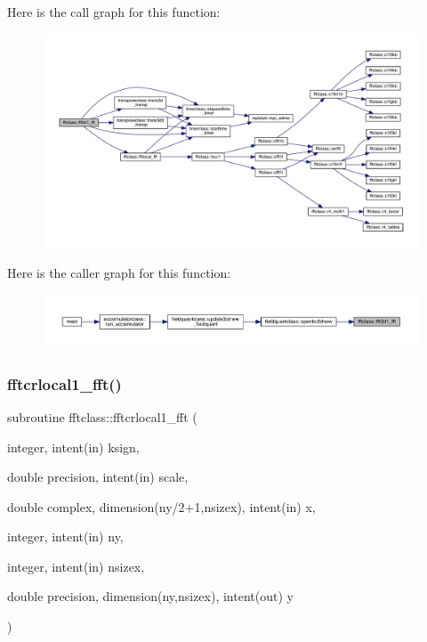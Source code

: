 Here is the call graph for this function\+:
\nopagebreak
\begin{figure}[H]
\begin{center}
\leavevmode
\includegraphics[width=350pt]{namespacefftclass_acef38aed3ece8d2c1120ce0004e6297e_cgraph}
\end{center}
\end{figure}
Here is the caller graph for this function\+:\nopagebreak
\begin{figure}[H]
\begin{center}
\leavevmode
\includegraphics[width=350pt]{namespacefftclass_acef38aed3ece8d2c1120ce0004e6297e_icgraph}
\end{center}
\end{figure}
\mbox{\label{namespacefftclass_a25ecfa928dd28501b9c251c1e887996b}} 
\subsubsection{\texorpdfstring{fftcrlocal1\_fft()}{fftcrlocal1\_fft()}}
{\footnotesize\ttfamily subroutine fftclass\+::fftcrlocal1\+\_\+fft (\begin{DoxyParamCaption}\item[{integer, intent(in)}]{ksign,  }\item[{double precision, intent(in)}]{scale,  }\item[{double complex, dimension(ny/2+1,nsizex), intent(in)}]{x,  }\item[{integer, intent(in)}]{ny,  }\item[{integer, intent(in)}]{nsizex,  }\item[{double precision, dimension(ny,nsizex), intent(out)}]{y }\end{DoxyParamCaption})}

